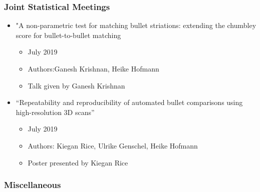 \documentclass[]{book}
\providecommand{\tightlist}{%
  \setlength{\itemsep}{0pt}\setlength{\parskip}{0pt}}
\begin{document}
\hypertarget{joint-statistical-meetings}{%
\subsubsection{Joint Statistical Meetings}\label{joint-statistical-meetings}}

\begin{itemize}
\item
  "A non-parametric test for matching bullet striations: extending the chumbley score for bullet-to-bullet matching

  \begin{itemize}
  \tightlist
  \item
    July 2019
  \item
    Authors:Ganesh Krishnan, Heike Hofmann
  \item
    Talk given by Ganesh Krishnan
  \end{itemize}
\item
  ``Repeatability and reproducibility of automated bullet comparisons using high-resolution 3D scans''

  \begin{itemize}
  \tightlist
  \item
    July 2019
  \item
    Authors: Kiegan Rice, Ulrike Genschel, Heike Hofmann
  \item
    Poster presented by Kiegan Rice
  \end{itemize}
\end{itemize}

\hypertarget{miscellaneous}{%
\subsubsection{Miscellaneous}\label{miscellaneous}}
\end{document}
